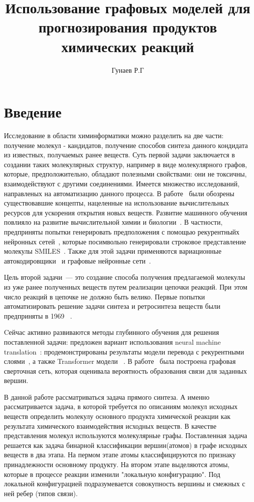 \documentclass[12pt, twoside]{article}
\title
[Использование графовых моделей для прогнозирования продуктов химических реакций]
{Использование графовых моделей для прогнозирования продуктов химических реакций}
\author{Гунаев Р.Г}
\begin{document}
\maketitle
\section{Введение}

Исследование в области химинформатики можно разделить на две части: получение молекул - кандидатов, получение способов синтеза данного кондидата из известных, получаемых ранее веществ. Суть первой задачи заключается в создании таких молекулярных структур, например в виде молекулярного графов, которые, предположительно, обладают полезными свойствами: они не токсичны, взаимодействуют с другими соединениями.  Имеется множество исследований, направленых на автоматизацию данного процесса. В работе~\cite{schneider2005computer} были обозрены существовавшие концепты, нацеленные на использование вычислительных ресурсов для ускорения открытия новых веществ.  Развитие машинного обучения повлияло на развитие вычислительной химии и биологии~\cite{butler2018machine}. В частности, предприняты попытки генерировать предположения с помощью рекурентныйх нейронных сетей~\cite{olivecrona2017molecular, gomez2018automatic}, которые посимвольно генерировали строковое представление молекулы SMILES~\cite{weininger1988smiles}. Также для этой задачи применяются вариационные автокодировщики~\cite{dai2018syntax} и графовые нейронные сети~\cite{de2018molgan, duvenaud2015convolutional}.   

Цель второй задачи~--- это создание способа получения предлагаемой молекулы из уже ранее полученных веществ путем реализации цепочки реакций. При этом число реакций в цепочке не должно быть велико. Первые попытки автоматизировать решение задачи синтеза и ретросинтеза веществ были предприняты в 1969 ~\cite{corey1969computer}.

Cейчас активно развиваются методы глубинного обучения для решения поставленной задачи: предложен вариант использования neural machine translation~\cite{bahdanau2014neural}: продемонстрированы результаты модели перевода с рекурентными слоями~\cite{schwaller2018found}, а также Transformer модели ~\cite{schwaller2018molecular}.  В работе~\cite{coley2018graph} была построена графовая сверточная сеть, которая оценивала вероятность образования связи для заданных вершин.

В данной работе рассматриваться задача прямого синтеза. А именно рассматривается задача, в которой требуется по описаниям молекул исходных веществ определить молекулу основного продукта химической реакции как результата химического взаимодействия исходных веществ. В качестве представления молекул используются молекулярные графы. Поставленная задача решается как задача бинарной классификации вершин(атомов) в графе исходных веществ в два этапа. На пермом этапе атомы классифицируются по признаку принадлежности основному продукту. На втором этапе выделяются атомы, которые в процессе реакции изменили "локальную конфигурацию". Под локальной конфигурацией подразумевается совокупность вершины и смежных с ней ребер (типов связи).
\end{document}
